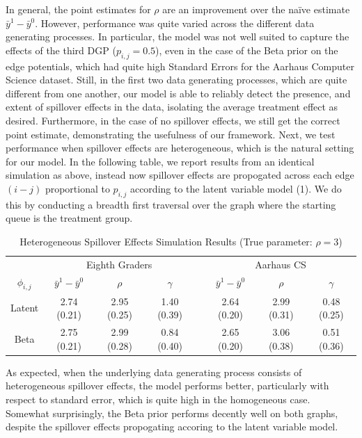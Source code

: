 \documentclass{article}
\begin{document}
In general, the point estimates for $\rho$ are an improvement over the naïve estimate $\bar{y}^{1} - \bar{y}^{0}$. However, 
performance was quite varied across the different data generating processes. In particular, the model was not well suited to capture the effects of the third DGP ($p_{i,j} = 0.5$), even in the 
case of the Beta prior on the edge potentials, which had quite high Standard Errors for the Aarhaus Computer Science dataset. Still, in the first two data generating processes, 
which are quite different from one another, our model is able to reliably detect the presence, and extent of spillover effects in the data, isolating the average treatment effect as desired. Furthermore, 
in the case of no spillover effects, we still get the correct point estimate, demonstrating the usefulness of our framework. Next, we test performance when spillover effects are heterogeneous, which is the natural setting for our model. In the following table, we report results from an identical simulation as above, instead 
now spillover effects are propogated across each edge $(i-j)$ proportional to $p_{i,j}$ according to the latent variable model (1). We do this by conducting a breadth first traversal over the graph where 
the starting queue is the treatment group. 
\begin{table}[htbp]
  \caption{Heterogeneous Spillover Effects Simulation Results (True parameter: $\rho = 3$)}
  \label{table2}
  \centering
  \begin{tabular}{cccccccc}
    \toprule
    & \multicolumn{3}{c}{Eighth Graders} & & \multicolumn{3}{c}{Aarhaus CS}              \\
    \cmidrule{2-4} \cmidrule{6-8}
    $\phi_{i,j}$ & $\bar{y}^1 - \bar{y}^0$ & $\rho$ & $\gamma$ & & $\bar{y}^1 - \bar{y}^0$ & $\rho$ & $\gamma$ \\
    \midrule
     Latent & 2.74 (0.21) & 2.95 (0.25) & 1.40 (0.39) & & 2.64 (0.20) & 2.99 (0.31) & 0.48 (0.25)    \\
    \cmidrule{1-8}
    Beta & 2.75 (0.21) & 2.99 (0.28) & 0.84 (0.40) & & 2.65 (0.20) & 3.06 (0.38) & 0.51 (0.36) \\
    \bottomrule
  \end{tabular}
\end{table}

As expected, when the underlying data generating process consists of heterogeneous spillover effects, the model performs better, particularly with respect 
to standard error, which is quite high in the homogeneous case. Somewhat surprisingly, the Beta prior performs decently well on both graphs, despite the spillover 
effects propogating accoring to the latent variable model. 
\end{document}
